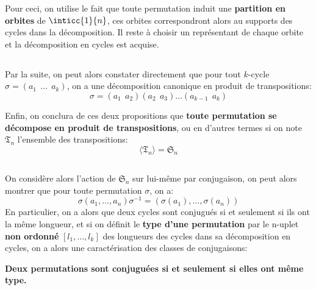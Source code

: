 Pour ceci, on utilise le fait que toute permutation induit une \textbf{partition en orbites} de \( \inticc{1}{n} \), ces orbites correspondront alors au supports des cycles dans la décomposition. Il reste à choisir un représentant de chaque orbite et la décomposition en cycles est acquise.
\subsection*{}
Par la suite, on peut alors constater directement que pour tout \(k\)-cycle \(\sigma = (a_1 \;\, \ldots \;\, a_k)\), on a une décomposition canonique en produit de transpositions:
\[ 
   \sigma = (a_1 \;\, a_2)(a_2 \;\, a_3)\ldots(a_{k-1} \;\, a_k)
\]

Enfin, on conclura de ces deux propositions que \textbf{toute permutation se décompose en produit de transpositions}, ou en d'autres termes si on note \(\mathfrak{T}_n\) l'ensemble des transpositions:
\[ 
   \langle \mathfrak{T}_n \rangle = \mathfrak{S}_n
\]
\subsection*{}
On considère alors l'action de \(  \mathfrak{S}_n \) sur lui-même par conjugaison, on peut alors montrer que pour toute permutation \(\sigma\), on a:
\[ 
   \sigma(a_1, \ldots, a_n)\sigma^{-1} = (\sigma(a_1), \ldots, \sigma(a_n))
\]
En particulier, on a alors que deux cycles sont conjugués si et seulement si ils ont la même longueur, et si on définit le \textbf{type d'une permutation} par le n-uplet \textbf{non ordonné} \( [l_1, \ldots, l_k] \) des longueurs des cycles dans sa décomposition en cycles, on a alors une caractérisation des classes de conjugaisons:
\begin{center}
   \textbf{Deux permutations sont conjuguées si et seulement si elles ont même type.}
\end{center}
